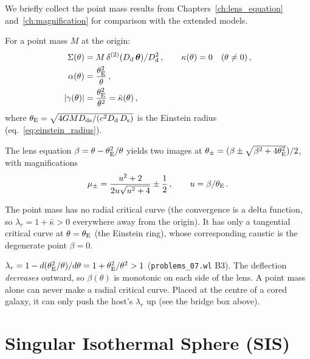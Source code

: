 We briefly collect the point mass results from
Chapters~\ref{ch:lens_equation} and~\ref{ch:magnification} for
comparison with the extended models.

For a point mass $M$ at the origin:
\begin{align}
    \Sigma(\theta) &= M\,\delta^{(2)}(D_{\mathrm{d}}\,\boldsymbol{\theta}) / D_{\mathrm{d}}^2
    \,, \qquad
    \kappa(\theta) = 0 \quad (\theta \neq 0) \,,
    \label{eq:pm_kappa} \\
    \alpha(\theta) &= \frac{\theta_{\mathrm{E}}^2}{\theta} \,,
    \label{eq:pm_alpha} \\
    |\gamma(\theta)| &= \frac{\theta_{\mathrm{E}}^2}{\theta^2}
    = \bar{\kappa}(\theta) \,,
    \label{eq:pm_gamma}
\end{align}
where $\theta_{\mathrm{E}} = \sqrt{4G M D_{\mathrm{ds}} / (c^2 D_{\mathrm{d}}\,D_{\mathrm{s}})}$
is the Einstein radius (eq.~\ref{eq:einstein_radius}).

The lens equation $\beta = \theta - \theta_{\mathrm{E}}^2/\theta$ yields two
images at $\theta_\pm = (\beta \pm \sqrt{\beta^2 + 4\theta_{\mathrm{E}}^2})/2$,
with magnifications
\begin{equation}
    \mu_\pm = \frac{u^2 + 2}{2u\sqrt{u^2 + 4}} \pm \frac{1}{2} \,,
    \qquad u = \beta/\theta_{\mathrm{E}} \,.
    \label{eq:pm_magnification}
\end{equation}

\begin{remark}
The point mass has no radial critical curve (the convergence is a
delta function, so $\lambda_r = 1 + \bar{\kappa} > 0$ everywhere
away from the origin).  It has only a tangential critical curve at
$\theta = \theta_{\mathrm{E}}$ (the Einstein ring), whose corresponding caustic
is the degenerate point $\beta = 0$.
\end{remark}

\begin{annotation}
$\lambda_r = 1-d(\theta_{\mathrm{E}}^2/\theta)/d\theta = 1+\theta_{\mathrm{E}}^2/\theta^2>1$
(\texttt{problems\_07.wl} B3).  The deflection \emph{decreases} outward, so
$\beta(\theta)$ is monotonic on each side of the lens.  A point mass alone can
never make a radial critical curve.  Placed at the centre of a cored galaxy,
it can only push the host's $\lambda_r$ up (see the bridge box above).
\end{annotation}


\section{Singular Isothermal Sphere (SIS)}
\label{sec:sis}

